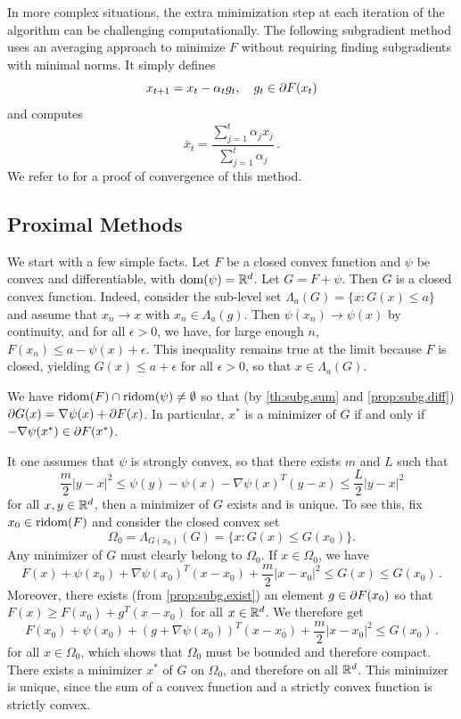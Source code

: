 In more complex situations, the extra minimization step at each iteration of the algorithm can be challenging computationally. The following subgradient method uses an averaging approach to minimize $F$ without requiring finding subgradients with minimal norms. It simply defines
\[
x_{t+1} = x_t  - \alpha_t g_t, \quad g_t \in \partial F(x_t)
\]
and computes
\[
\bar x_{t} = \frac{\sum_{j=1}^t \alpha_j x_j}{\sum_{j=1}^t\alpha_j}\,.
\]
We refer to \citep{wright2022optimization} for a proof of convergence of this method.



\subsection{Proximal Methods}
\label{sec:proximal}

We start with a few simple facts. Let $F$ be a closed convex function and $\psi$ be convex and differentiable, with $\mathrm{dom}(\psi) = {\mathbb{R}}^d$. Let $G = F + \psi$. Then $G$ is a closed convex function. Indeed, consider the sub-level set $\Lambda_a(G) = \{x: G(x) \leq a\}$ and assume that $x_n\to x$ with $x_n \in \Lambda_a(g)$. Then $\psi(x_n) \to \psi(x)$ by continuity, and for all $\epsilon > 0$, we have, for large enough $n$, $F(x_n) \leq a - \psi(x) + \epsilon$. This inequality remains true at the limit because $F$ is closed, yielding $G(x) \leq a+\epsilon$ for all $\epsilon>0$, so that $x\in \Lambda_a(G)$.

We have $\mathrm{ridom}(F) \cap \mathrm{ridom}(\psi) \neq \emptyset$ so that (by \cref{th:subg.sum} and \cref{prop:subg.diff}) $\partial G(x) = \nabla \psi(x) + \partial F(x)$. In particular, $x^*$ is a minimizer of $G$ if and only if $-\nabla \psi(x^*) \in \partial F(x^*)$. 

It one assumes that $\psi$ is strongly convex, so that there exists $m$ and $L$ such that
\[
\frac{m}{2} |y-x|^2 \leq \psi(y) - \psi(x) - \nabla \psi(x)^T(y-x) \leq \frac{L}{2} |y-x|^2
\]
for all $x,y\in {\mathbb{R}}^d$, then a minimizer of $G$ exists and is unique. To see this, fix $x_0\in \mathrm{ridom}(F)$ and consider the closed convex set
\[
\Omega_0 = \Lambda_{G(x_0)}(G) = \{x: G(x) \leq G(x_0)\}.
\]
Any minimizer of $G$ must clearly belong to $\Omega_0$. If $x\in \Omega_0$, we have
\[
F(x) + \psi(x_0) + \nabla \psi(x_0)^T(x-x_0) +  \frac{m}{2} |x-x_0|^2 \leq G(x) \leq G(x_0)\,.
\]
Moreover, there exists (from \cref{prop:subg.exist}) an element $g\in\partial F(x_0)$ so that 
$F(x) \geq F(x_0) + g^T (x-x_0)$ for all $x\in {\mathbb{R}}^d$. We therefore get
\[
F(x_0) + \psi(x_0) + (g+\nabla \psi(x_0))^T(x-x_0) +  \frac{m}{2} |x-x_0|^2  \leq G(x_0)\,.
\]
for all $x\in \Omega_0$, which shows that $\Omega_0$ must be bounded and therefore compact. There exists a minimizer $x^*$ of $G$ on $\Omega_0$, and therefore on all ${\mathbb{R}}^d$. This minimizer is unique, since the sum of a convex function and a strictly convex function is strictly convex. 
 

